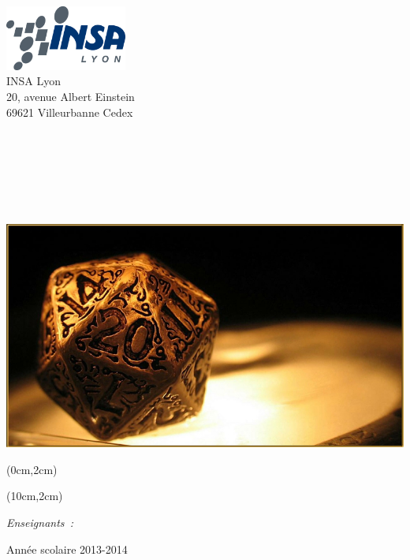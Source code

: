 \begin{center}
	\thispagestyle{empty}
	\begin{minipage}[t]{0.48\textwidth}
	  \begin{flushleft}
	    \includegraphics [width=40mm]{img/insa_logo.png} \\[0.5cm]
			INSA Lyon\\
			20, avenue Albert Einstein\\
			69621 Villeurbanne Cedex
	  \end{flushleft}
	\end{minipage}
	\begin{minipage}[t]{0.48\textwidth}
	  \begin{flushright}
	  \end{flushright}
	\end{minipage} \\[2cm]

	\textsc{\Large \reportsubject}\\[0.3cm]
	\HRule \\[0.4cm]
	{\Huge \bfseries \reporttitle}\\[0.6cm]
	{\Large \dateperiod}\\[0.4cm]
	\HRule \\[1cm]

	\includegraphics [width=0.6\linewidth]{img/die.jpg} \\[0.7cm]

	\begin{textblock*}{6cm}(0cm,2cm)
		\begin{flushleft}
	 	\noindent \Large \reportauthor
		\end{flushleft}
	\end{textblock*}

	\begin{textblock*}{6cm}(10cm,2cm)
		\begin{flushright}
	 	\noindent \Large \emph{Enseignants~:} \\
	    	\enseignants
		\end{flushright}
	\end{textblock*}

	\vfill
	\large Année scolaire 2013-2014
	\clearpage
\end{center}

